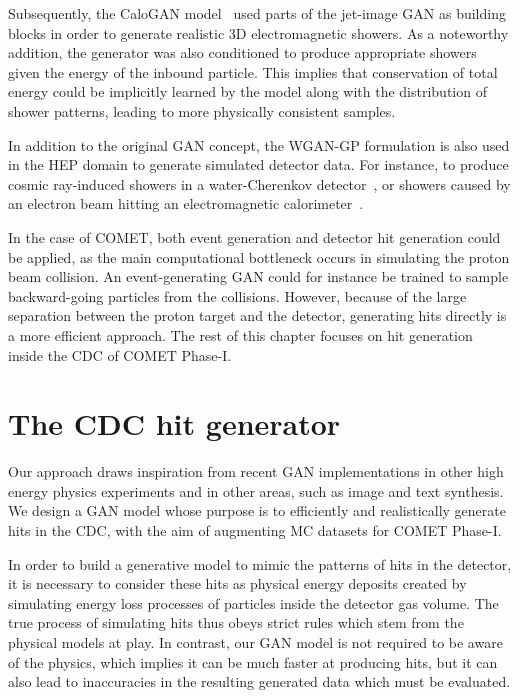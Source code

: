 Subsequently, the {\sc CaloGAN} model~\cite{paganini_calogan_2018} used parts of
the jet-image GAN as building blocks in order to generate realistic 3D
electromagnetic showers. As a noteworthy addition, the generator was also
conditioned to produce appropriate showers given the energy of the inbound
particle. This implies that conservation of total energy could be implicitly
learned by the model along with the distribution of shower patterns, leading to
more physically consistent samples.


In addition to the original GAN concept, the WGAN-GP formulation is also used in
the HEP domain to generate simulated detector data. For instance, to produce
cosmic ray-induced showers in a water-Cherenkov detector~\cite{Erdmann2018}, or
showers caused by an electron beam hitting an electromagnetic
calorimeter~\cite{Erdmann2019}.

In the case of COMET, both event generation and detector hit generation could be
applied, as the main computational bottleneck occurs in simulating the proton
beam collision. An event-generating GAN could for instance be trained to sample
backward-going particles from the collisions. However, because of the large
separation between the proton target and the detector, generating hits directly
is a more efficient approach. The rest of this chapter focuses on hit
generation inside the CDC of COMET Phase-I.





\section{The CDC hit generator}
Our approach draws inspiration from recent GAN implementations in other high
energy physics experiments and in other areas, such as image and text
synthesis. We design a GAN model whose purpose is to efficiently and
realistically generate hits in the CDC, with the aim of augmenting MC datasets
for COMET Phase-I.

In order to build a generative model to mimic the patterns of hits in the
detector, it is necessary to consider these hits as physical energy
deposits created by simulating energy loss processes of particles inside the
detector gas volume. The true process of simulating hits thus obeys strict rules
which stem from the physical models at play. In contrast, our GAN model is not
required to be aware of the physics, which implies it can be much faster at
producing hits, but it can also lead to inaccuracies in the resulting generated
data which must be evaluated.

